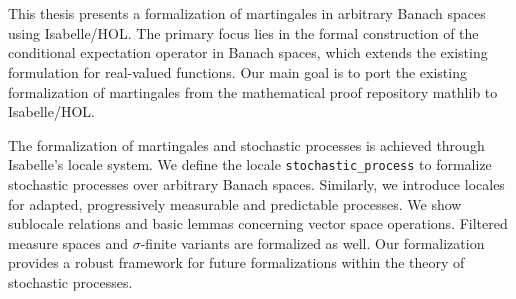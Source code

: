 ﻿\chapter{\abstractname}
This thesis presents a formalization of martingales in arbitrary Banach spaces using Isabelle/HOL. The primary focus lies in the formal construction of the conditional expectation operator in Banach spaces, which extends the existing formulation for real-valued functions. 
Our main goal is to port the existing formalization of martingales from the mathematical proof repository \textsf{mathlib} to Isabelle/HOL. 

The formalization of martingales and stochastic processes is achieved through Isabelle's locale system. We define the locale \lstinline{stochastic_process} to formalize stochastic processes over arbitrary Banach spaces. Similarly, we introduce locales for adapted, progressively measurable and predictable processes. We show sublocale relations and basic lemmas concerning vector space operations. Filtered measure spaces and $\sigma$-finite variants are formalized as well. Our formalization provides a robust framework for future formalizations within the theory of stochastic processes.